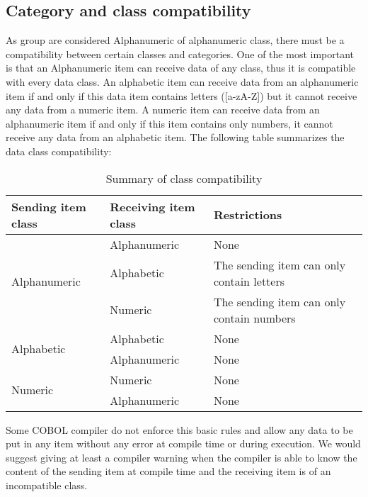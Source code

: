 \documentclass[a4paper,10pt]{article}
\begin{document}
\subsection{Category and class compatibility}
As group are considered Alphanumeric of alphanumeric class, there must be a compatibility between
certain classes and categories. One of the most important is that an Alphanumeric item can receive
data of any class, thus it is compatible with every data class. An alphabetic item can receive
data from an alphanumeric item if and only if this data item contains letters ([a-zA-Z]) but it
cannot receive any data from a numeric item. A numeric item can receive data from an alphanumeric
item if and only if this item contains only numbers, it cannot receive any data from an alphabetic
item. The following table summarizes the data class compatibility:
\begin{table}[H]
  \caption{Summary of class compatibility}
  \label{tab:class_comp}
  \begin{center}
    \begin{tabular}[c]{|l|l|l|}
      \hline
      Sending item class & Receiving item class & Restrictions \\ \hline
      \multirow{3}{*}{Alphanumeric} & Alphanumeric & None \\ \cline{2-3}
                                    & Alphabetic   & The sending item can only contain letters \\ \cline{2-3}
                                    & Numeric      & The sending item can only contain numbers \\ \hline
      \multirow{2}{*}{Alphabetic}   & Alphabetic   & None                                      \\ \cline{2-3}
                                    & Alphanumeric & None                                      \\ \hline
      \multirow{2}{*}{Numeric}      & Numeric      & None                                      \\ \cline{2-3}
                                    & Alphanumeric & None                                      \\ \hline
    \end{tabular}
  \end{center}
\end{table}
Some COBOL compiler do not enforce this basic rules and allow any data to be put in any item without
any error at compile time or during execution. We would suggest giving at least a compiler warning
when the compiler is able to know the content of the sending item at compile time and the receiving
item is of an incompatible class.
\pagebreak
\end{document}

